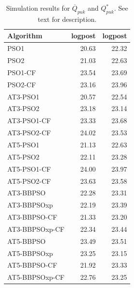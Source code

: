 \documentclass[cmbright]{staauth}
\begin{document}
\begin{table}[ht]
\begin{tabular}{l|r|r}
  \hline
Algorithm & logpost & logpost \\
  \hline
PSO1 & 20.63 & 22.32 \\
  PSO2 & 21.03 & 22.63 \\
  PSO1-CF & 23.54 & 23.69 \\
  PSO2-CF & 23.16 & 23.96 \\
   \hline
AT3-PSO1 & 20.57 & 22.54 \\
  AT3-PSO2 & 23.18 & 23.14 \\
  AT3-PSO1-CF & 23.33 & 23.68 \\
  AT3-PSO2-CF & 24.02 & 23.53 \\
   \hline
AT5-PSO1 & 21.13 & 22.63 \\
  AT5-PSO2 & 22.11 & 23.28 \\
  AT5-PSO1-CF & 24.00 & 23.97 \\
  AT5-PSO2-CF & 23.63 & 23.58 \\
   \hline
AT3-BBPSO & 22.28 & 23.31 \\
  AT3-BBPSOxp & 22.19 & 23.39 \\
  AT3-BBPSO-CF & 21.33 & 23.20 \\
  AT3-BBPSOxp-CF & 22.34 & 23.44 \\
   \hline
AT5-BBPSO & 23.49 & 23.51 \\
  AT5-BBPSOxp & 23.25 & 23.15 \\
  AT5-BBPSO-CF & 21.92 & 23.33 \\
  AT5-BBPSOxp-CF & 22.76 & 23.25 \\
   \hline
\end{tabular}
\endgroup
\caption{Simulation results for $\overline{Q}_{puk}$ and $Q^*_{puk}$. See text for description.}
\label{tab:psokriging}
\end{table}
\end{document}
